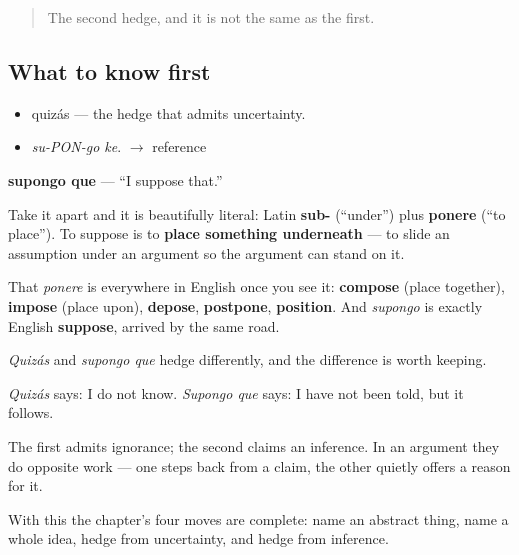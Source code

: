 \label{lesson:ES-C271-supongo-que}



\begin{quote}
The second hedge, and it is not the same as the first.
\end{quote}

\subsection*{What to know first}
\begin{itemize}
\raggedright
  \item quizás — the hedge that admits uncertainty.
\end{itemize}

\begin{sounds}
\begin{itemize}
\raggedright
  \item \emph{su-PON-go ke}. $\to$ reference
\end{itemize}
\end{sounds}

\begin{cousinweb}
\textbf{supongo que} — \textquotedblleft{}I suppose that.\textquotedblright{}

Take it apart and it is beautifully literal: Latin \textbf{sub-} (\textquotedblleft{}under\textquotedblright{}) plus \textbf{ponere} (\textquotedblleft{}to place\textquotedblright{}). To suppose is to \textbf{place something underneath} — to slide an assumption under an argument so the argument can stand on it.

That \emph{ponere} is everywhere in English once you see it: \textbf{compose} (place together), \textbf{impose} (place upon), \textbf{depose}, \textbf{postpone}, \textbf{position}. And \emph{supongo} is exactly English \textbf{suppose}, arrived by the same road.
\end{cousinweb}

\begin{grammarlens}[title={What you've built}]
\emph{Quizás} and \emph{supongo que} hedge differently, and the difference is worth keeping.

\emph{Quizás} says: I do not know. \emph{Supongo que} says: I have not been told, but it follows.

The first admits ignorance; the second claims an inference. In an argument they do opposite work — one steps back from a claim, the other quietly offers a reason for it.

With this the chapter's four moves are complete: name an abstract thing, name a whole idea, hedge from uncertainty, and hedge from inference.
\end{grammarlens}

